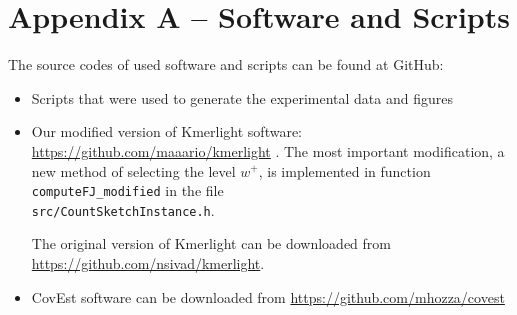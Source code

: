 \chapter*{Appendix A -- Software and Scripts}

The source codes of used software and scripts can be found at GitHub:
\begin{itemize}
\item Scripts that were used to generate the experimental data and figures
\item Our modified version of Kmerlight software: \url{https://github.com/maaario/kmerlight} .
The most important modification, a new method of selecting the level $w^+$, is implemented in
function \texttt{computeFJ\_modified} in the file \\ \texttt{src/CountSketchInstance.h}.

The original version of Kmerlight can be downloaded from \url{https://github.com/nsivad/kmerlight}.

\item CovEst software \cite{Hozza2015} can be downloaded from \url{https://github.com/mhozza/covest}
\end{itemize}